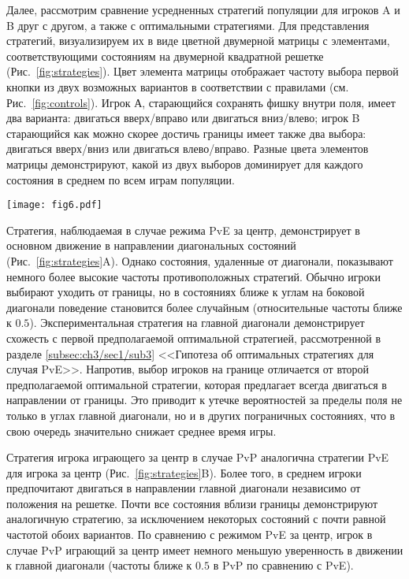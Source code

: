 Далее, рассмотрим сравнение усредненных стратегий популяции для игроков A и B друг с другом, а также с оптимальными стратегиями. 
Для представления стратегий, визуализируем их в виде цветной двумерной матрицы с элементами, 
соответствующими состояниям на двумерной квадратной решетке (Рис.~\cref{fig:strategies}). 
Цвет элемента матрицы отображает частоту выбора первой кнопки из двух возможных вариантов в соответствии с правилами (см. Рис.~\cref{fig:controls}). 
Игрок А, старающийся сохранять фишку внутри поля, имеет два варианта: двигаться вверх/вправо или двигаться вниз/влево; 
игрок B старающийся как можно скорее достичь границы имеет также два выбора: двигаться вверх/вниз или двигаться влево/вправо. 
Разные цвета элементов матрицы демонстрируют, какой из двух выборов доминирует для каждого состояния в среднем по всем играм популяции.

\begin{figure*}[t]
    \centering
    \texttt{[image: fig6.pdf]}
    \caption{
        Визуализация средних популяционных стратегий для разных режимов, полученных в эксперименте. 
        Цвет ячеек отображает частоту выбора первой чистой стратегии: для игры за центр (A, B, C) и для игры за границу (D, E, F).
    }  
    \label{fig:strategies}
    
\end{figure*}

Стратегия, наблюдаемая в случае режима PvE за центр, демонстрирует в основном движение в направлении диагональных состояний (Рис.~\cref{fig:strategies}A). 
Однако состояния, удаленные от диагонали, показывают немного более высокие частоты противоположных стратегий. 
Обычно игроки выбирают уходить от границы, но в состояниях ближе к углам на боковой диагонали поведение становится более случайным 
(относительные частоты ближе к $0.5$). Экспериментальная стратегия на главной диагонали демонстрирует схожесть с первой предполагаемой оптимальной стратегией, 
рассмотренной в разделе \cref{subsec:ch3/sec1/sub3} <<Гипотеза об оптимальных стратегиях для случая PvE>>. Напротив, выбор игроков на границе отличается от второй предполагаемой оптимальной стратегии, 
которая предлагает всегда двигаться в направлении от границы. Это приводит к утечке вероятностей за пределы поля не только в углах главной диагонали, 
но и в других пограничных состояниях, что в свою очередь значительно снижает среднее время игры. 

Стратегия игрока играющего за центр в случае PvP аналогична стратегии PvE для игрока за центр (Рис.~\cref{fig:strategies}B). 
Более того, в среднем игроки предпочитают двигаться в направлении главной диагонали независимо от положения на решетке. 
Почти все состояния вблизи границы демонстрируют аналогичную стратегию, за исключением некоторых состояний с почти равной частотой обоих вариантов. 
По сравнению с режимом PvE за центр, игрок в случае PvP играющий за центр имеет немного меньшую уверенность в движении к главной диагонали 
(частоты ближе к $0.5$ в PvP по сравнению с PvE).

